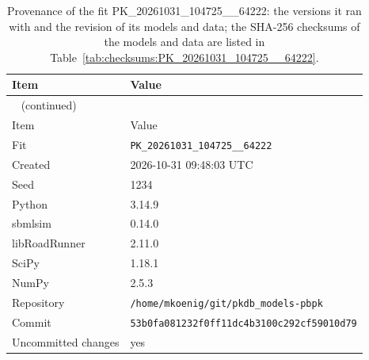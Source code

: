 \documentclass{article}
\begin{document}
\begin{longtable}{ll}
\caption{Provenance of the fit PK\_20261031\_104725\_\_64222: the versions it ran with and the revision of its models and data; the SHA-256 checksums of the models and data are listed in Table~\ref{tab:checksums:PK_20261031_104725__64222}.}\label{tab:provenance:PK_20261031_104725__64222} \\
\toprule
Item & Value \\
\midrule
\endfirsthead
\multicolumn{2}{l}{\small\tablename~\thetable{} (continued)} \\
\toprule
Item & Value \\
\midrule
\endhead
\bottomrule
\endlastfoot
Fit & \texttt{PK\_20261031\_104725\_\_64222} \\
Created & 2026-10-31 09:48:03 UTC \\
Seed & 1234 \\
Python & 3.14.9 \\
sbmlsim & 0.14.0 \\
libRoadRunner & 2.11.0 \\
SciPy & 1.18.1 \\
NumPy & 2.5.3 \\
Repository & \texttt{/home/mkoenig/git/pkdb\_models-pbpk} \\
Commit & \texttt{53b0fa081232f0ff11dc4b3100c292cf59010d79} \\
Uncommitted changes & yes \\
\end{longtable}



\end{document}
